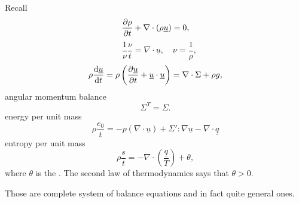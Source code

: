 \documentclass[11pt,oneside]{book}
\renewcommand{\vec}[1]{\underline{#1}}
\theoremstyle{definition} %
\theoremstyle{plain} %
\theoremstyle{remark} %
\theoremstyle{underline}
\begin{document}
  Recall
  \begin{displaymath}
    \ptf{\rho}{t} + \nabla \cdot (\rho \vec u) = 0,  
  \end{displaymath}
  \begin{equation}
    \quad \frac{1}{\nu} \dfrac{\nu}{t} = \nabla \cdot \vec u, 
    \quad \nu = \frac{1}{\rho},
    \label{eq:3.1}
  \end{equation}
  \begin{displaymath}
    \rho \dfrac{\vec u }{t} = \rho \left(  \ptf{\vec u}{t} + \vec u \cdot \vec u \right) = \nabla \cdot \Sigma  + \rho g,
  \end{displaymath}
  angular momentum balance
  \begin{displaymath}
    \Sigma^T = \Sigma.
  \end{displaymath}
  energy per unit mass
  \begin{equation}
    \rho \dfrac{e_0}{t} = - p (\nabla \cdot \vec u) + \Sigma' : \nabla \vec u - \nabla \cdot \vec q
    \label{eq:3.2}
  \end{equation}
  entropy per unit mass
  \begin{displaymath}
    \rho \dfrac{s}{t} = - \nabla \cdot \left( \frac{\vec q }{T} \right) + \theta,
  \end{displaymath}
  where $\theta$ is the . The second law of thermodynamics says that $\theta > 0 $.

  Those are complete system of balance equations and in fact quite general ones.
\end{document}
